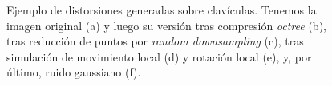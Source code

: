 \begin{figure}[htp]
\begin{subfigure}[b]{.5\textwidth}
    \caption{}
  \end{subfigure}
  \caption[Ejemplo de distorsiones generadas sobre clavículas.]{Ejemplo de distorsiones generadas sobre clavículas.
    Tenemos la imagen original (a) y luego su versión tras compresión \emph{octree} (b), 
    tras reducción de puntos por \emph{random downsampling} (c), tras simulación 
    de movimiento local (d) y rotación local (e), y, por último, ruido gaussiano (f).
  }
  \label{fig:DistorsionesGeneradas}
\end{figure}
